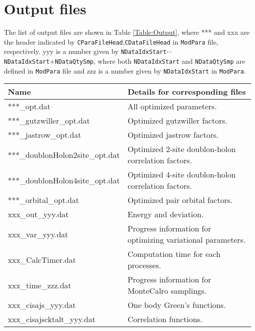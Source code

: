 \newpage
\section{Output files}
\label{Sec:outputfile}
The list of output files are shown in Table \ref{Table:Output}, where *** and xxx are the header indicated by \verb|CParaFileHead|,\verb|CDataFileHead| in \verb|ModPara| file, respectively. yyy is a number given by \verb|NDataIdxStart|$\cdots$\verb|NDataIdxStart|+\verb|NDataQtySmp|, where both \verb|NDataIdxStart| and \verb|NDataQtySmp| are defined in \verb|ModPara| file and zzz is a number given by \verb|NDataIdxStart| in \verb|ModPara|.

 \begin{table*}[h!]
\begin{center}
  \begin{tabular}{|ll|} \hline
           Name     & Details for corresponding files       \\   \hline\hline
           ***\_opt.dat       &  All optimized parameters.       \\ \hline 
           ***\_gutzwiller\_opt.dat       &   Optimized gutzwiller factors.  \\
           ***\_jastrow\_opt.dat        &  Optimized jastrow factors.         \\ 
           ***\_doublonHolon2site\_opt.dat  &   Optimized 2-site doublon-holon correlation factors.  \\  
           ***\_doublonHolon4site\_opt.dat  &   Optimized 4-site doublon-holon correlation factors. \\  
           ***\_orbital\_opt.dat  &   Optimized pair orbital factors. \\  \hline
           xxx\_out\_yyy.dat &  Energy and deviation.\\ 
           xxx\_var\_yyy.dat &  Progress information for optimizing variational parameters.\\  \hline
           xxx\_CalcTimer.dat & Computation time for each processes.\\  
           xxx\_time\_zzz.dat & Progress information for MonteCalro samplings.\\  \hline
           \hline
           xxx\_cisajs\_yyy.dat & One body Green's functions.\\
           xxx\_cisajscktalt\_yyy.dat & Correlation functions.\\
\hline
  \end{tabular}
\end{center}
\caption{List of the output files. }
\label{Table:Output}
\end{table*}%

